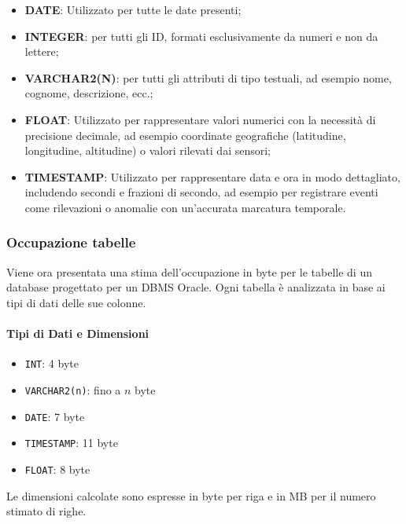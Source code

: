 \begin{itemize}
    \item \textbf{DATE}: Utilizzato per tutte le date presenti;
    \item \textbf{INTEGER}: per tutti gli ID, formati esclusivamente da numeri e non da lettere;
    \item \textbf{VARCHAR2(N)}: per tutti gli attributi di tipo testuali, ad esempio nome, cognome, descrizione, ecc.;
    \item \textbf{FLOAT}: Utilizzato per rappresentare valori numerici con la necessità di precisione decimale, ad esempio coordinate geografiche (latitudine, longitudine, altitudine) o valori rilevati dai sensori;
    \item \textbf{TIMESTAMP}: Utilizzato per rappresentare data e ora in modo dettagliato, includendo secondi e frazioni di secondo, ad esempio per registrare eventi come rilevazioni o anomalie con un'accurata marcatura temporale.
\end{itemize}

\subsubsection{Occupazione tabelle}
Viene ora presentata una stima dell'occupazione in byte per le tabelle di un database progettato per un DBMS Oracle. Ogni tabella è analizzata in base ai tipi di dati delle sue colonne.

\paragraph{Tipi di Dati e Dimensioni}
\begin{itemize}
    \item \texttt{INT}: 4 byte
    \item \texttt{VARCHAR2(n)}: fino a $n$ byte
    \item \texttt{DATE}: 7 byte
    \item \texttt{TIMESTAMP}: 11 byte
    \item \texttt{FLOAT}: 8 byte
\end{itemize}

\noindent
Le dimensioni calcolate sono espresse in byte per riga e in MB per il numero stimato di righe.

